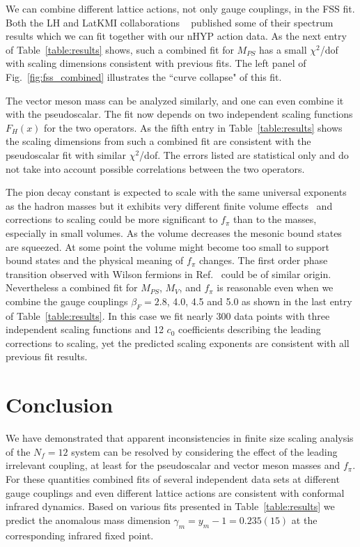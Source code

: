 \documentclass[aps,prl,twocolumn,]{revtex4-1}  %
\newcommand{\refcite}[1]{Ref.~\cite{#1}}
\newcommand{\fig}[1]{Fig.~\ref{#1}}
\begin{document}
We can  combine  different lattice actions, not only  gauge couplings,  in the FSS fit. Both the LH and LatKMI collaborations ~\protect\cite{Fodor:2011tu,Aoki:2012eq} published some of their spectrum results which we can fit together with our nHYP action data. As the  next entry of Table~\ref{table:results} shows, such a combined fit  for $M_{PS}$ has a  small $\chi^2$/dof  with scaling dimensions consistent with previous fits.  The left panel of \fig{fig:fss_combined} illustrates the ``curve collapse" of this fit. 

The vector meson mass can be analyzed similarly,  and one can even combine it with the pseudoscalar. The fit now depends on
two independent scaling functions $F_H(x)$ for the two operators.
As the fifth entry in Table~\ref{table:results}  shows  the scaling dimensions from such a combined fit are consistent with the pseudoscalar fit  with similar $\chi^2$/dof. 
The  errors listed are statistical only and do not take into account possible correlations between the two operators.
 

The pion decay constant   is expected to scale with the same universal exponents as the hadron masses but it exhibits very different finite volume effects~\cite{Fodor:2011tu,Aoki:2012eq} and  corrections to  scaling could be more significant to $f_\pi$ than to the masses, especially in small volumes. As the volume decreases the mesonic bound states are squeezed.  At some point the volume might become too small to support bound states and the physical meaning of $f_\pi$ changes. The first order phase transition observed with Wilson fermions in \refcite{Ishikawa:2013tua} could be of similar origin.   Nevertheless a combined fit for $M_{PS}$, $M_V$, and $f_\pi$ is reasonable even when we combine the  gauge couplings $\beta_F=2.8$, 4.0, 4.5 and 5.0 as shown in the last entry of Table~\ref{table:results}.
In this case we fit nearly 300 data points with three independent scaling functions and 12 $c_0$ coefficients describing the leading corrections to scaling, yet the predicted scaling exponents are consistent with all previous fit results. 


\section{Conclusion}
We have demonstrated that apparent inconsistencies in finite size scaling analysis of the $N_f=12$ system can be resolved by considering the effect of the leading irrelevant  coupling, at least for the pseudoscalar and vector meson masses and $f_\pi$.
For these quantities combined fits of several independent data sets  at different gauge couplings and even different lattice actions are consistent with conformal infrared dynamics.  Based on  various fits presented in Table~\ref{table:results} we predict the anomalous mass dimension $\gamma_m=y_m-1=0.235(15)$ at the corresponding infrared fixed point.
\end{document}
